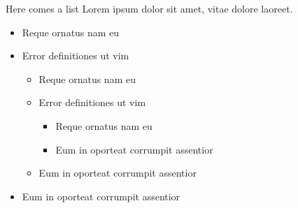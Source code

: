 \documentclass[11pt,usenames,dvipsnames]{beamer}
\begin{document}
\begin{frame}{Here comes a list}
    Lorem ipsum dolor sit amet, vitae dolore laoreet. 
    \begin{itemize}
        \item Reque ornatus nam eu
        \item Error definitiones ut vim
        \begin{itemize}
            \item Reque ornatus nam eu
            \item Error definitiones ut vim
            \begin{itemize}
                \item Reque ornatus nam eu
                \item Eum in oporteat corrumpit assentior 
            \end{itemize}
            \item Eum in oporteat corrumpit assentior 
        \end{itemize}
        \item Eum in oporteat corrumpit assentior 
    \end{itemize}
\end{frame}

\end{document}
